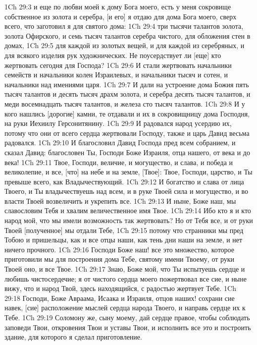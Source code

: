 1Ch 29:3  и еще по любви моей к дому Бога моего, есть у меня сокровище собственное из золота и серебра, [и его] я отдаю для дома Бога моего, сверх всего, что заготовил я для святого дома:
1Ch 29:4  три тысячи талантов золота, золота Офирского, и семь тысяч талантов серебра чистого, для обложения стен в домах,
1Ch 29:5  для каждой из золотых вещей, и для каждой из серебряных, и для всякого изделия рук художнических. Не поусердствует ли [еще] кто жертвовать сегодня для Господа?
1Ch 29:6  И стали жертвовать начальники семейств и начальники колен Израилевых, и начальники тысяч и сотен, и начальники над имениями царя.
1Ch 29:7  И дали на устроение дома Божия пять тысяч талантов и десять тысяч драхм золота, и серебра десять тысяч талантов, и меди восемнадцать тысяч талантов, и железа сто тысяч талантов.
1Ch 29:8  И у кого нашлись [дорогие] камни, те отдавали и их в сокровищницу дома Господня, на руки Иехиилу Герсонитянину.
1Ch 29:9  И радовался народ усердию их, потому что они от всего сердца жертвовали Господу, также и царь Давид весьма радовался.
1Ch 29:10  И благословил Давид Господа пред всем собранием, и сказал Давид: благословен Ты, Господи Боже Израиля, отца нашего, от века и до века!
1Ch 29:11  Твое, Господи, величие, и могущество, и слава, и победа и великолепие, и все, [что] на небе и на земле, [Твое]: Твое, Господи, царство, и Ты превыше всего, как Владычествующий.
1Ch 29:12  И богатство и слава от лица Твоего, и Ты владычествуешь над всем, и в руке Твоей сила и могущество, и во власти Твоей возвеличить и укрепить все.
1Ch 29:13  И ныне, Боже наш, мы славословим Тебя и хвалим величественное имя Твое.
1Ch 29:14  Ибо кто я и кто народ мой, что мы имели возможность так жертвовать? Но от Тебя все, и от руки Твоей [полученное] мы отдали Тебе,
1Ch 29:15  потому что странники мы пред Тобою и пришельцы, как и все отцы наши, как тень дни наши на земле, и нет ничего прочного.
1Ch 29:16  Господи Боже наш! все это множество, которое приготовили мы для построения дома Тебе, святому имени Твоему, от руки Твоей оно, и все Твое.
1Ch 29:17  Знаю, Боже мой, что Ты испытуешь сердце и любишь чистосердечие; я от чистого сердца моего пожертвовал все сие, и ныне вижу, что и народ Твой, здесь находящийся, с радостью жертвует Тебе.
1Ch 29:18  Господи, Боже Авраама, Исаака и Израиля, отцов наших! сохрани сие навек, [сие] расположение мыслей сердца народа Твоего, и направь сердце их к Тебе.
1Ch 29:19  Соломону же, сыну моему, дай сердце правое, чтобы соблюдать заповеди Твои, откровения Твои и уставы Твои, и исполнить все это и построить здание, для которого я сделал приготовление.
